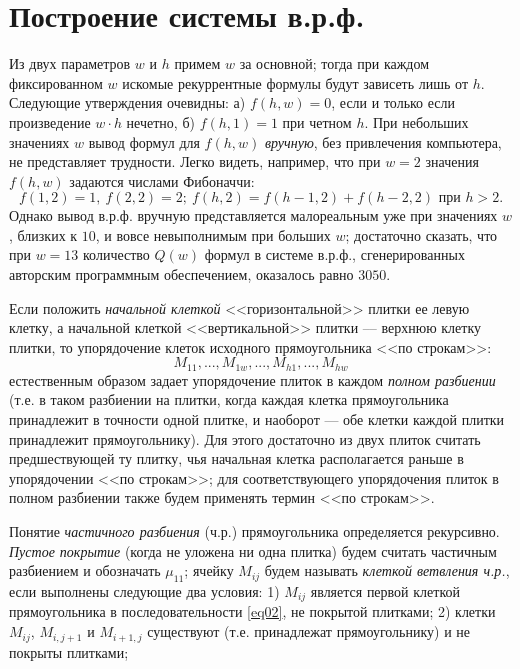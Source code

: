 \section{Построение системы в.р.ф.}

Из двух параметров $w$ и $h$ примем $w$ за основной; тогда при каждом фиксированном $w$ искомые рекуррентные формулы будут зависеть лишь от $h$.
Следующие утверждения очевидны: а) $f(h,w)=0$, если и только если произведение $w\cdot h$ нечетно, б) $f(h,1)=1$ при четном $h$. При небольших значениях $w$ вывод формул для $f(h,w)$ \textit{ вручную}, без привлечения компьютера, не представляет трудности. Легко видеть, например, что при $w=2$ значения $f(h,w)$ задаются числами Фибоначчи:
$$
f(1,2)=1,\ f(2,2)=2;\ f(h,2)=f(h-1,2)+f(h-2,2) \text { при }  h>2.
$$
%
Однако вывод в.р.ф. вручную представляется малореальным уже при значениях $w$, близких к $10$, и вовсе невыполнимым при больших $w$; достаточно сказать, что при ${w=13}$ количество $Q(w)$ формул в системе в.р.ф., сгенерированных авторским программным обеспечением, оказалось равно $3050$.

Если положить \textit{ начальной клеткой} <<горизонтальной>> плитки ее левую клетку, а начальной клеткой <<вертикальной>> плитки --– верхнюю клетку плитки, то упорядочение клеток исходного прямоугольника <<по строкам>>:
\begin{equation}\label{eq02}
M_{11}, ..., M_{1w}, ..., M_{h1},..., M_{hw}
\end{equation}
естественным образом задает упорядочение плиток в каждом \textit{ полном разбиении} (т.е. в таком разбиении на плитки, когда каждая клетка прямоугольника принадлежит в точности одной плитке, и наоборот --- обе клетки каждой плитки принадлежит прямоугольнику). Для этого достаточно из двух плиток считать предшествующей ту плитку, чья начальная клетка располагается раньше в упорядочении <<по строкам>>; для соответствующего упорядочения плиток в полном разбиении также будем применять термин <<по строкам>>.

Понятие \textit{ частичного разбиения} (ч.р.) прямоугольника определяется рекурсивно. \textit{ Пустое покрытие} (когда не уложена ни одна плитка) будем считать частичным разбиением и обозначать $\mu_{11}$;
ячейку $M_{ij}$ будем называть \textit{ клеткой ветвления ч.р.}, если выполнены следующие два условия:
1) $M_{ij}$ является первой клеткой прямоугольника в последовательности \eqref{eq02}, не покрытой плитками; 2) клетки $M_{ij}$, $M_{i,j+1}$  и $M_{i+1,j}$ существуют (т.е. принадлежат прямоугольнику) и не покрыты плитками;

